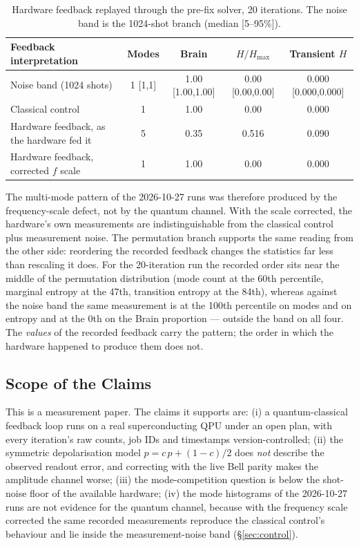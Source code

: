 \documentclass[sigconf,anonymous=false]{acmart}
\begin{document}
\begin{table}[h]
\centering
\caption{Hardware feedback replayed through the pre-fix solver, 20 iterations. The noise band is the 1024-shot branch (median [5--95\%]).}
\label{tab:control}
\begin{tabular}{lcccc}
\toprule
Feedback interpretation & Modes & Brain & $H/H_{\max}$ & Transient $H$ \\
\midrule
Noise band (1024 shots) & 1 [1,1] & 1.00 [1.00,1.00] & 0.00 [0.00,0.00] & 0.000 [0.000,0.000] \\
Classical control & 1 & 1.00 & 0.00 & 0.000 \\
Hardware feedback, as the hardware fed it & 5 & 0.35 & 0.516 & 0.090 \\
Hardware feedback, corrected $f$ scale & 1 & 1.00 & 0.00 & 0.000 \\
\bottomrule
\end{tabular}
\end{table}

The multi-mode pattern of the 2026-10-27 runs was therefore produced by the frequency-scale
defect, not by the quantum channel. With the scale corrected, the hardware's own
measurements are indistinguishable from the classical control plus measurement noise. The
permutation branch supports the same reading from the other side: reordering the recorded
feedback changes the statistics far less than rescaling it does. For the 20-iteration run
the recorded order sits near the middle of the permutation distribution (mode count at the
60th percentile, marginal entropy at the 47th, transition entropy at the 84th), whereas
against the noise band the same measurement is at the 100th percentile on modes and on
entropy and at the 0th on the Brain proportion --- outside the band on all four. The
\emph{values} of the recorded feedback carry the pattern; the order in which the hardware
happened to produce them does not.

\subsection{Scope of the Claims}

\label{sec:scope}

This is a measurement paper. The claims it supports are: (i) a quantum-classical feedback loop
runs on a real superconducting QPU under an open plan, with every iteration's raw counts,
job IDs and timestamps version-controlled; (ii) the symmetric depolarisation model
$p = c\,p + (1-c)/2$ does \emph{not} describe the observed readout error, and correcting with
the live Bell parity makes the amplitude channel worse; (iii) the mode-competition question
is below the shot-noise floor of the available hardware; (iv) the mode histograms of the
2026-10-27 runs are not evidence for the quantum channel, because with the frequency scale
corrected the same recorded measurements reproduce the classical control's behaviour and lie
inside the measurement-noise band (\S\ref{sec:control}).
\end{document}
